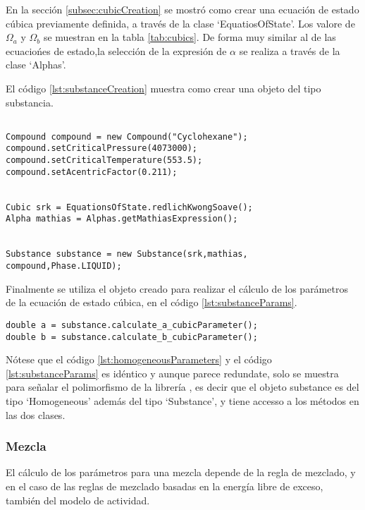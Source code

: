 En la sección \ref{subsec:cubicCreation} se mostró como crear una ecuación de estado cúbica previamente definida, a través de la clase `EquatiosOfState'. Los valore de $\Omega_a$ y $\Omega_b$ se muestran en la tabla \ref{tab:cubics}. De forma muy similar al de las ecuaciońes de estado,la selección de la expresión de $\alpha$ se realiza a través de la clase `Alphas'.

El código \ref{lst:substanceCreation} muestra como crear una objeto del tipo substancia.

\begin{lstlisting}[caption={Creación de un objeto tipo `Substance' para el compuesto Ciclohexano, con la ecuación de estado Soave Redlich Kwong y la expresión de $\alpha$ de mathias },label={lst:substanceCreation}]

Compound compound = new Compound("Cyclohexane");
compound.setCriticalPressure(4073000);
compound.setCriticalTemperature(553.5);
compound.setAcentricFactor(0.211);


Cubic srk = EquationsOfState.redlichKwongSoave();
Alpha mathias = Alphas.getMathiasExpression();


Substance substance = new Substance(srk,mathias, compound,Phase.LIQUID);
\end{lstlisting}

	Finalmente se utiliza el objeto creado para realizar el cálculo de los parámetros de la ecuación de estado cúbica, en el código \ref{lst:substanceParams}.

\begin{lstlisting}[caption={Cálculo de los parámetros para la ecuación de estado cúbica con la clase `Substance'.},label={lst:substanceParams}]
double a = substance.calculate_a_cubicParameter();
double b = substance.calculate_b_cubicParameter();
\end{lstlisting}
 

Nótese que el código \ref{lst:homogeneousParameters} y el código \ref{lst:substanceParams} es idéntico y aunque parece redundate, solo se muestra para señalar el polimorfismo de la librería , es decir que el objeto substance es del tipo `Homogeneous' además del tipo `Substance', y tiene accesso a los métodos en las dos clases.


\subsubsection{Mezcla}\label{subsec:mixture}

El cálculo de los parámetros para una mezcla depende de la regla de mezclado, y en el caso de las reglas de mezclado basadas en la energía libre de exceso, también del modelo de actividad.

